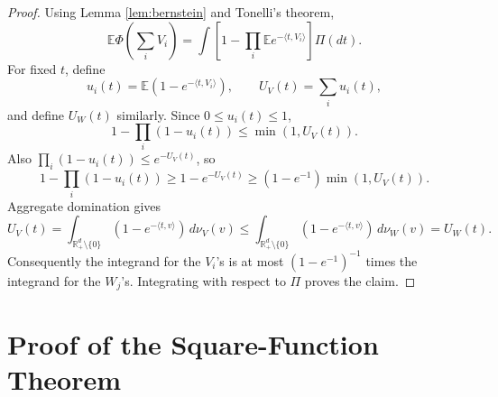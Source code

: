 \documentclass[11pt]{article}
\newcommand{\E}{\mathbb E}
\newcommand{\R}{\mathbb R}
\begin{document}
\begin{proof}
Using Lemma \ref{lem:bernstein} and Tonelli's theorem,
\[
  \E\Phi\left(\sum_i V_i\right)
  =
  \int
  \left[
    1-\prod_i \E e^{-\langle t,V_i\rangle}
  \right]\Pi(dt).
\]
For fixed \(t\), define
\[
  u_i(t)=\E\left(1-e^{-\langle t,V_i\rangle}\right),
  \qquad
  U_V(t)=\sum_i u_i(t),
\]
and define \(U_W(t)\) similarly.  Since \(0\le u_i(t)\le1\),
\[
  1-\prod_i(1-u_i(t))
  \le
  \min(1,U_V(t)).
\]
Also \(\prod_i(1-u_i(t))\le e^{-U_V(t)}\), so
\[
  1-\prod_i(1-u_i(t))
  \ge
  1-e^{-U_V(t)}
  \ge
  (1-e^{-1})\min(1,U_V(t)).
\]
Aggregate domination gives
\[
  U_V(t)
  =
  \int_{\R_+^d\setminus\{0\}}
      (1-e^{-\langle t,v\rangle})\,d\nu_V(v)
  \le
  \int_{\R_+^d\setminus\{0\}}
      (1-e^{-\langle t,v\rangle})\,d\nu_W(v)
  =
  U_W(t).
\]
Consequently the integrand for the \(V_i\)'s is at most
\((1-e^{-1})^{-1}\) times the integrand for the \(W_j\)'s.  Integrating with
respect to \(\Pi\) proves the claim.
\end{proof}

\section*{Proof of the Square-Function Theorem}
\end{document}
